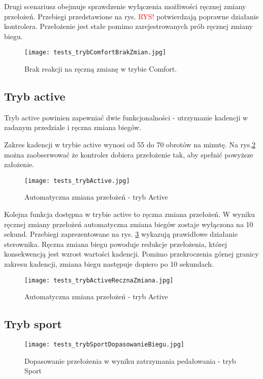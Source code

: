 Drugi scenariusz obejmuje sprawdzenie wyłączenia możłiwości ręcznej zmiany przełożeń. Przebiegi przedstawione na rys. \textcolor{red}{RYS!} potwierdzają poprawne działanie kontrolera. Przełożenie jest stałe pomimo zarejestrowanych prób ręcznej zmiany biegu.
\begin{figure}[h]
    \centering
    \texttt{[image: tests\_trybComfortBrakZmian.jpg]}
    \caption{Brak reakcji na ręczną zmianę w trybie Comfort.}
    \label{fig:tests_noChange}
\end{figure}

\subsection{Tryb active}

Tryb active powinien zapewniać dwie funkcjonalności - utrzymanie kadencji w zadanym przedziale i ręczna zmiana biegów.

Zakres kadencji w trybie active wynosi od 55 do 70 obrotów na minutę. Na rys.\ref{fig:tests_active} można zaobserwować że kontroler dobiera  przełożenie tak, aby spełnić powyższe założenie.
\begin{figure}[h]
    \centering
    \texttt{[image: tests\_trybActive.jpg]}
    \caption{Automatyczna zmiana przełożeń - tryb Active}
    \label{fig:tests_active}
\end{figure}
Kolejna funkcja dostępna w trybie active to ręczna zmiana przełożeń. W wyniku ręcznej zmiany przełożeń automatyczna zmiana biegów zostaje wyłączona na 10 sekund. Przebiegi zaprezentowane na rys. \ref{fig:tests_activeReczna} wykazują prawidłowe działanie sterownika. Ręczna zmiana biegu powoduje redukcje przełożenia, której konsekwencją jest wzrost wartości kadencji. Pomimo przekroczenia górnej granicy zakresu kadencji, zmiana biegu następuje dopiero po 10 sekundach.    
\begin{figure}[h]
    \centering
    \texttt{[image: tests\_trybActiveRecznaZmiana.jpg]}
    \caption{Automatyczna zmiana przełożeń - tryb Active}
    \label{fig:tests_activeReczna}
\end{figure}
\subsection{Tryb sport}

\begin{figure}[h]
    \centering
    \texttt{[image: tests\_trybSportDopasowanieBiegu.jpg]}
    \caption{Dopasowanie przełożenia w wyniku zatrzymania pedałowania - tryb Sport}
    \label{fig:tests_gearSpeedSelection}
\end{figure}

